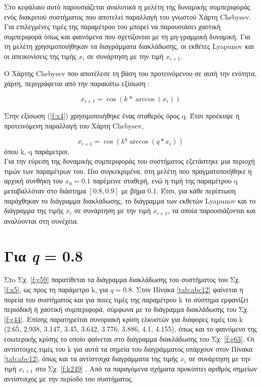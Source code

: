 Στο κεφάλαιο αυτό παρουσιάζεται αναλυτικά η μελέτη της δυναμικής συμπεριφοράς ενός διακριτού συστήματος που αποτελεί παραλλαγή του γνωστού Χάρτη Chebysev. Για επιλεγμένες τιμές της παραμέτρου του μπορεί να παρουσιάσει χαοτική συμπεριφορά όπως και φαινόμενα που σχετίζονται με τη μη-γραμμική δυναμική. Για τη μελέτη χρησιμοποιήθηκαν τα διαγράμματα διακλάδωσης, οι εκθέτες Lyapunov και οι απεικονίσεις της τιμής \(x_i\) σε συνάρτηση με  την τιμή \(x_{i+1}\).

Ο Χάρτης Chebysev  που αποτέλεσε τη βάση του προτεινόμενου σε αυτή την ενότητα, χάρτη, περιγράφεται από την παρακάτω εξίσωση \cite{b9}:

\begin{equation}
	x_{i+1}=\cos(k*\arccos(x_i))
	\label{f:x4}
\end{equation}


Στην εξίσωση (\ref{f:x4}) χρησιμοποιήθηκε ένας σταθερός όρος q. Έτσι προέκυψε η προτεινόμενη παραλλαγή του Χάρτη Chebysev,

\begin{equation}
	x_{i+1}=\cos(k^q\arccos(q*x_i))
	\label{f:x5}
\end{equation}
όπου k, q παράμετροι.\\

Για την εύρεση της δυναμικής συμπεριφοράς του συστήματος εξετάστηκε μια περιοχή τιμών των παραμέτρων του. Πιο συγκεκριμένα, στη μελέτη που πραγματοποιήθηκε η αρχική συνθήκη του $x_0 =0.1$ παρέμεινε  σταθερή, ενώ η τιμή της παραμέτρου q μεταβαλλόταν στο διάστημα $[0.8,0.9]$ με βήμα $0.1$. Έτσι, για κάθε περίπτωση παράχθηκαν το διάγραμμα διακλάδωσης, το διάγραμμα των εκθετών Lyapunov και το διάγραμμα της τιμής \(x_i\) σε συνάρτηση με  την τιμή \(x_{i+1}\), τα οποία παρουσιάζονται και αναλύονται στη συνέχεια.\\

\vspace{\fill}


\section{Για \emph{q} = 0.8}

Στo Σχ. \ref{f:g59} παρατίθεται τα διάγραμμα διακλάδωσης του συστήματος του Σχ. \ref{f:x5}, ως προς τη παράμετρο k, για $q =0.8$. Στον Πίνακα \ref{tab:abc12} φαίνεται η πορεία του συστήματος και για ποιες τιμές της παραμέτρου k το σύστημα εμφανίζει περιοδική ή χαοτική συμπεριφορά, σύμφωνα με το διάγραμμα διακλάδωσης του Σχ. \ref{f:g44}. Επίσης παρατηρείται συνοριακή κρίση ελκυστών για διάφορες τιμές του k (2.65, 2.938, 3.147, 3.45, 3.642, 3.776, 3.886, 4.1, 4.155), όπως και το φαινόμενο της εσωτερικής κρίσης το οποίο φαίνεται στο διάγραμμα διακλάδωσης του Σχ. \ref{f:g63}. Οι αντίστοιχες τιμές του k για αυτά τα σημεία του διαγράμματος υπάρχουν στον Πίνακα \ref{tab:abc12}, όπως και τα αντίστοιχα διαγράμματα της τιμής \(x_i\) σε συνάρτηση με την τιμή \(x_{i+1}\) στο Σχ. \ref{f:k249} . Από τα παραγόμενα σχήματα προκύπτει αριθμός σημείων αντίστοιχος με την περίοδο του συστήματος.

